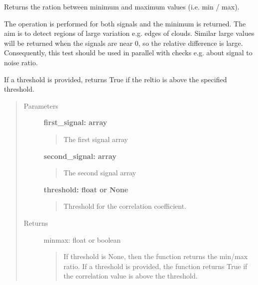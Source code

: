 \documentclass[letterpaper,10pt,english]{sphinxmanual}
\begin{document}
\begin{fulllineitems}
\label{fit_checks:fit_checks.check_min_max_ratio}
Returns the ration between minimum and maximum values (i.e. min / max).

The operation is performed for both signals and the minimum is returned. The
aim is to detect regions of large variation e.g. edges of clouds. Similar
large values will be returned when the signals are near 0, so the relative difference is
large. Consequently, this test should be used in parallel with checks e.g. about
signal to noise ratio.

If a threshold is provided, returns True if
the reltio  is above the specified threshold.
\begin{quote}\begin{description}
\item[{Parameters}] \leavevmode
\textbf{first\_signal: array}
\begin{quote}

The first signal array
\end{quote}

\textbf{second\_signal: array}
\begin{quote}

The second signal array
\end{quote}

\textbf{threshold: float or None}
\begin{quote}

Threshold for the correlation coefficient.
\end{quote}

\item[{Returns}] \leavevmode
minmax: float or boolean
\begin{quote}

If threshold is None, then the function returns the min/max ratio.
If a threshold is provided, the function returns True if the correlation value is
above the threshold.
\end{quote}

\end{description}\end{quote}

\end{fulllineitems}

\end{document}
